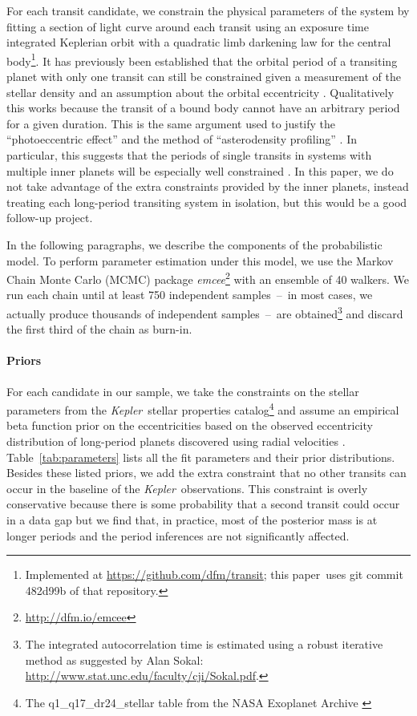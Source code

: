 \documentclass[manuscript, letterpaper]{aastex6}
\newcommand{\project}[1]{\textsl{#1}}
\newcommand{\kepler}{\project{Kepler}}
\newcommand{\emcee}{\project{emcee}}
\newcommand{\paper}{paper}
\begin{document}
For each transit candidate, we constrain the physical parameters of the system
by fitting a section of light curve around each transit using an exposure time
integrated  Keplerian orbit with a quadratic limb darkening law for the
central body\footnote{Implemented at \url{https://github.com/dfm/transit};
this \paper\ uses git commit \textsf{482d99b} of that repository.}.
It has previously been established that the orbital period of a transiting
planet with only one transit can still be constrained given a measurement of
the stellar density and an assumption about the orbital eccentricity \cite[for
example][]{Wang:2015, Osborn:2016}.
Qualitatively this works because the transit of a bound body cannot have an
arbitrary period for a given duration.
This is the same argument used to justify the ``photoeccentric effect''
\citep{Dawson:2012} and the method of ``asterodensity profiling''
\citep{Kipping:2014b}.
In particular, this suggests that the periods of single transits in systems
with multiple inner planets will be especially well constrained
\citep{Kipping:2012}.
In this \paper, we do not take advantage of the extra constraints provided by
the inner planets, instead treating each long-period transiting system in
isolation, but this would be a good follow-up project.

In the following paragraphs, we describe the components of the probabilistic
model.
To perform parameter estimation under this model, we use the Markov Chain
Monte Carlo (MCMC) package \emcee\footnote{\url{http://dfm.io/emcee}}
\citep{Foreman-Mackey:2013} with an ensemble of 40 walkers.
We run each chain until at least 750 independent samples~--~in most cases, we
actually produce thousands of independent samples~--~are obtained\footnote{The
integrated autocorrelation time is estimated using a robust iterative method
as suggested by Alan Sokal:
\url{http://www.stat.unc.edu/faculty/cji/Sokal.pdf}.} and discard the first
third of the chain as burn-in.


\paragraph{Priors}

For each candidate in our sample, we take the constraints on the stellar
parameters from the \kepler\ stellar properties catalog\footnote{The
\textsf{q1\_q17\_dr24\_stellar} table from the NASA Exoplanet Archive
\citep{Huber:2014}} and assume an empirical beta function prior on the
eccentricities based on the observed eccentricity distribution of long-period
planets discovered using radial velocities \citep{Kipping:2013}.
Table~\ref{tab:parameters} lists all the fit parameters and their prior
distributions.
Besides these listed priors, we add the extra constraint that no other
transits can occur in the baseline of the \kepler\ observations.
This constraint is overly conservative because there is some probability that
a second transit could occur in a data gap but we find that, in practice, most
of the posterior mass is at longer periods and the period inferences are not
significantly affected.
\end{document}
